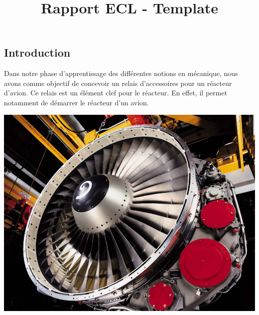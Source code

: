 \documentclass{config}
\title{Rapport ECL - Template} %
\begin{document}
\lstset{language=[x86masm]Assembler} 
\begin{spacing}{1.2}




        
\fairemarges %
\fairepagedegarde %
\tabledematieres %






\newpage
\section{Introduction} 

Dans notre phase d'apprentissage des différentes notions en mécanique, nous avons comme objectif de concevoir un relais d'accessoires pour un réacteur d'avion.
Ce relais est un élément clef pour le réacteur. En effet, il permet notamment de démarrer le réacteur d'un avion.



\begin{center}
\includegraphics[scale=0.4]{CFM56-3C1-CFMi.jpg}
\end{center}


\end{spacing}
\end{document}
